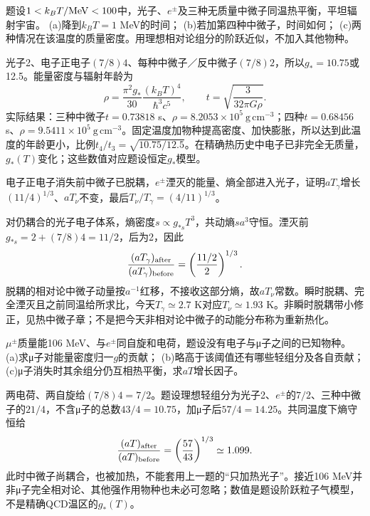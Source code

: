 \begin{exercise}
题设$1<k_BT/{\rm MeV}<100$中，光子、$e^\pm$及三种无质量中微子同温热平衡，平坦辐射宇宙。
(a)降到$k_BT=1$ MeV的时间；
(b)若加第四种中微子，时间如何；
(c)两种情况在该温度的质量密度。用理想相对论组分的阶跃近似，不加入其他物种。
\end{exercise}
\begin{solution}
光子2、电子正电子$(7/8)4$、每种中微子／反中微子$(7/8)2$，所以$g_*=10.75$或12.5。能量密度与辐射年龄为
\[
 \rho=\frac{\pi^2g_*}{30}\frac{(k_BT)^4}{\hbar^3c^5},\qquad
 t=\sqrt{\frac{3}{32\pi G\rho}}.
\]
实际结果：三种中微子$t=0.73818$ s、$\rho=8.2053\times10^5\ \mathrm{g\,cm^{-3}}$；四种$t=0.68456$ s、$\rho=9.5411\times10^5\ \mathrm{g\,cm^{-3}}$。固定温度加物种提高密度、加快膨胀，所以达到此温度的年龄更小，比例$t_4/t_3=\sqrt{10.75/12.5}$。在精确热历史中电子已非完全无质量，$g_*(T)$变化；这些数值对应题设恒定$g_*$模型。
\end{solution}

\begin{exercise}
电子正电子消失前中微子已脱耦，$e^\pm$湮灭的能量、熵全部进入光子，证明$aT_\gamma$增长$(11/4)^{1/3}$、$aT_\nu$不变，最后$T_\nu/T_\gamma=(4/11)^{1/3}$。
\end{exercise}
\begin{solution}
对仍耦合的光子电子体系，熵密度$s\propto g_{*s}T^3$，共动熵$sa^3$守恒。湮灭前$g_{*s}=2+(7/8)4=11/2$，后为2，因此
\[
 \frac{(aT_\gamma)_{\rm after}}{(aT_\gamma)_{\rm before}}
 =\left(\frac{11/2}{2}\right)^{1/3}.
\]
脱耦的相对论中微子动量按$a^{-1}$红移，不接收这部分熵，故$aT_\nu$常数。瞬时脱耦、完全湮灭且之前同温给所求比，今天$T_\gamma\simeq2.7$ K对应$T_\nu\simeq1.93$ K。非瞬时脱耦带小修正，见热中微子章；不是把今天非相对论中微子的动能分布称为重新热化。
\end{solution}

\begin{exercise}
$\mu^\pm$质量能106 MeV、与$e^\pm$同自旋和电荷，题设没有电子与μ子之间的已知物种。
(a)求μ子对能量密度归一$g$的贡献；
(b)略高于该阈值还有哪些轻组分及各自贡献；
(c)μ子消失时其余组分仍互相热平衡，求$aT$增长因子。
\end{exercise}
\begin{solution}
两电荷、两自旋给$(7/8)4=7/2$。题设理想轻组分为光子2、$e^\pm$的$7/2$、三种中微子的$21/4$，不含μ子的总数$43/4=10.75$，加μ子后$57/4=14.25$。共同温度下熵守恒给
\[
 \frac{(aT)_{\rm after}}{(aT)_{\rm before}}
 =\left(\frac{57}{43}\right)^{1/3}\simeq1.099.
\]
此时中微子尚耦合，也被加热，不能套用上一题的“只加热光子”。接近106 MeV并非μ子完全相对论、其他强作用物种也未必可忽略；数值是题设阶跃粒子气模型，不是精确QCD温区的$g_*(T)$。
\end{solution}

